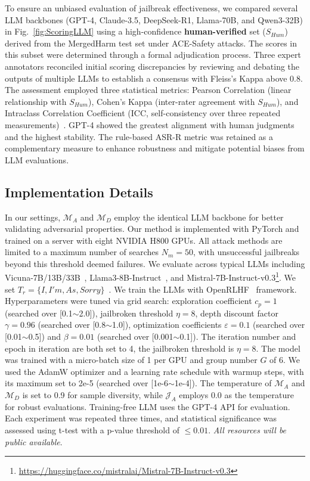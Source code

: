 \documentclass[11pt]{article}
\begin{document}
To ensure an unbiased evaluation of jailbreak effectiveness, we compared several LLM backbones (GPT-4, Claude-3.5, DeepSeek-R1, Llama-70B, and Qwen3-32B) in Fig.~\ref{fig:ScoringLLM} using a high-confidence \textbf{human-verified} set ($S_{Hum}$) derived from the MergedHarm test set under ACE-Safety attacks. The scores in this subset were determined through a formal adjudication process. Three expert annotators reconciled initial scoring discrepancies by reviewing and debating the outputs of multiple LLMs to establish a consensus with Fleiss's Kappa above 0.8. The assessment employed three statistical metrics: Pearson Correlation (linear relationship with $S_{Hum}$), Cohen’s Kappa (inter-rater agreement with $S_{Hum}$), and Intraclass Correlation Coefficient (ICC, self-consistency over three repeated measurements)~\citep{schober2021statistics}. GPT-4 showed the greatest alignment with human judgments and the highest stability. The rule-based ASR-R metric was retained as a complementary measure to enhance robustness and mitigate potential biases from LLM evaluations.




\subsection{Implementation Details}  \label{app:implement}
In our settings, $\mathcal{M}_{A}$ and $\mathcal{M}_{D}$ employ the identical LLM backbone for better validating adversarial properties. Our method is implemented with PyTorch and trained on a server with eight NVIDIA H800 GPUs. All attack methods are limited to a maximum number of searches $N_{m}=50$, with unsuccessful jailbreaks beyond this threshold deemed failures. We evaluate across typical LLMs including Vicuna-7B/13B/33B~\citep{vicuna}, Llama3-8B-Instruct~\citep{llama3}, and Mistral-7B-Instruct-v0.3\footnote{\footnotesize{\url{https://huggingface.co/mistralai/Mistral-7B-Instruct-v0.3}}}. We set $T_r = \{I, I'm, As, Sorry\}$~\citep{gptfuzzer,lin2024towards}. We train the LLMs with OpenRLHF~\citep{hu2024openrlhf} framework. Hyperparameters were tuned via grid search: exploration coefficient $c_{p}=1$ (searched over [0.1$\sim$2.0]), jailbroken threshold $\eta=8$, depth discount factor $\gamma=0.96$ (searched over [0.8$\sim$1.0]), optimization coefficients $\varepsilon=0.1$ (searched over [0.01$\sim$0.5]) and $\beta=0.01$ (searched over [0.001$\sim$0.1]). The iteration number and epoch in iteration are both set to 4, the jailbroken threshold is $\eta=8$. The model was trained with a micro-batch size of 1 per GPU and group number $G$ of 6. We used the AdamW optimizer and a learning rate schedule with warmup steps, with its maximum set to 2e-5 (searched over [1e-6$\sim$1e-4]). The temperature of $\mathcal{M}_{A}$ and $\mathcal{M}_{D}$ is set to 0.9 for sample diversity, while $\mathcal{J}_{A}$ employs 0.0 as the temperature for robust evaluations. Training-free LLM uses the GPT-4 API for evaluation. Each experiment was repeated three times, and statistical significance was assessed using t-test with a p-value threshold of $\leq 0.01$. \textit{All resources will be public available}.
\end{document}
